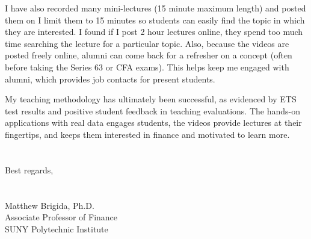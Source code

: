 \documentclass[12pt]{article}
\begin{document}
I have also recorded many mini-lectures (15 minute maximum length) and posted them on \href{https://www.youtube.com/channel/UCwekb0vAK-FKaqPF5gfd0eQ}{\color{Blue}{my YouTube channel.}} I limit them to 15 minutes so students can easily find the topic in which they are interested.  I found if I post 2 hour lectures online, they spend too much time searching the lecture for a particular topic.  Also, because the videos are posted freely online, alumni can come back for a refresher on a concept (often before taking the Series 63 or CFA exams).  This helps keep me engaged with alumni, which provides job contacts for present students.  

My teaching methodology has ultimately been successful, as evidenced by ETS test results and positive student feedback in teaching evaluations.  The hands-on applications with real data engages students, the videos provide lectures at their fingertips, and keeps them interested in finance and motivated to learn more. \\
\\
\\
Best regards,\\
\\
\\
Matthew Brigida, Ph.D.\\
Associate Professor of Finance\\
SUNY Polytechnic Institute
\end{document}
